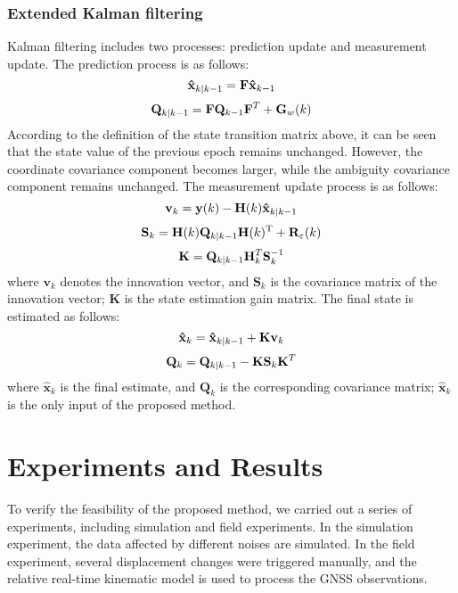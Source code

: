 \documentclass{svjour3}                     %
\begin{document}
\subsubsection{Extended Kalman filtering}
Kalman filtering includes two processes: prediction update and measurement update\citep{grewal2001kalman}. The prediction process is as follows:
\begin{equation}
{{\bf{\hat x}}_{k|k - 1}} = {\bf{F}}{{\bf{\hat x}}_{k - 1}}
\end{equation}
\begin{equation}
{{\bf{Q}}_{k|k - 1}} = {\bf{F}}{{\bf{Q}}_{k - 1}}{{\bf{F}}^T} + {{\bf{G}}_w}(k)
\end{equation}
According to the definition of the state transition matrix above, it can be seen that the state value of the previous epoch remains unchanged. However, the coordinate covariance component becomes larger, while the ambiguity covariance component remains unchanged. The measurement update process is as follows:
\begin{equation}
{{\bf{v}}_k} = {\bf{y}}(k) - {\bf{H}}(k){{\bf{\hat x}}_{k|k - 1}}
\end{equation}
\begin{equation}
{{\bf{S}}_k} = {\bf{H}}(k){{\bf{Q}}_{k|k - 1}}{\bf{H}}{(k)^{\rm{T}}} + {{\bf{R}}_\varepsilon }(k)
\end{equation}
\begin{equation}
{\bf{K}} = {{\bf{Q}}_{k|k - 1}}{\bf{H}}_k^T{\bf{S}}_k^{ - 1}
\end{equation}
where ${{\mathbf{v}}_{k}}$ denotes the innovation vector, and ${{\mathbf{S}}_{k}}$ is the covariance matrix of the innovation vector; $\mathbf{K}$ is the state estimation gain matrix. The final state is estimated as follows:
\begin{equation}
{{\bf{\hat x}}_k} = {{\bf{\hat x}}_{k|k - 1}} + {\bf{K}}{{\bf{v}}_k}
\end{equation}
\begin{equation}
{{\bf{Q}}_k} = {{\bf{Q}}_{k|k - 1}} - {\bf{K}}{{\bf{S}}_k}{{\bf{K}}^T}
\end{equation}
where ${{\mathbf{\hat{x}}}_{k}}$ is the final estimate, and ${{\mathbf{Q}}_{k}}$ is the corresponding covariance matrix; ${{\mathbf{\hat{x}}}_{k}}$ is the only input of the proposed method.  

\section{Experiments and Results}
\label{exp}
To verify the feasibility of the proposed method, we carried out a series of experiments, including simulation and field experiments. In the simulation experiment, the data affected by different noises are simulated. In the field experiment, several displacement changes were triggered manually, and the relative real-time kinematic model is used to process the GNSS observations.
\end{document}
